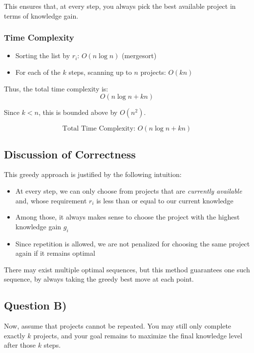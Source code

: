 \documentclass[12pt]{article}
\begin{document}
This ensures that, at every step, you always pick the best available project in terms of knowledge gain.

\subsubsection*{Time Complexity}

\begin{itemize}
    \item Sorting the list by $r_i$: $O(n \log n)$ (mergesort)
    \item For each of the $k$ steps, scanning up to $n$ projects: $O(k n)$
\end{itemize}

Thus, the total time complexity is:
\[
O(n \log n + k n)
\]

Since $k < n$, this is bounded above by $O(n^2)$.

\[
\boxed{\text{Total Time Complexity: } O(n \log n + k n)}
\]

\newpage

\subsection*{Discussion of Correctness}

This greedy approach is justified by the following intuition:

\begin{itemize}
    \item At every step, we can only choose from projects that are \textit{currently available} and, whose requirement $r_i$ is less than or equal to our current knowledge
    \item Among those, it always makes sense to choose the project with the highest knowledge gain $g_i$
    \item Since repetition is allowed, we are not penalized for choosing the same project again if it remains optimal
\end{itemize}

There may exist multiple optimal sequences, but this method guarantees one such sequence, by always taking the greedy best move at each point.
\newpage

\subsection*{Question B)}

Now, assume that projects cannot be repeated. You may still only complete exactly $k$ projects, and your goal remains to maximize the final knowledge level after those $k$ steps.
\end{document}
